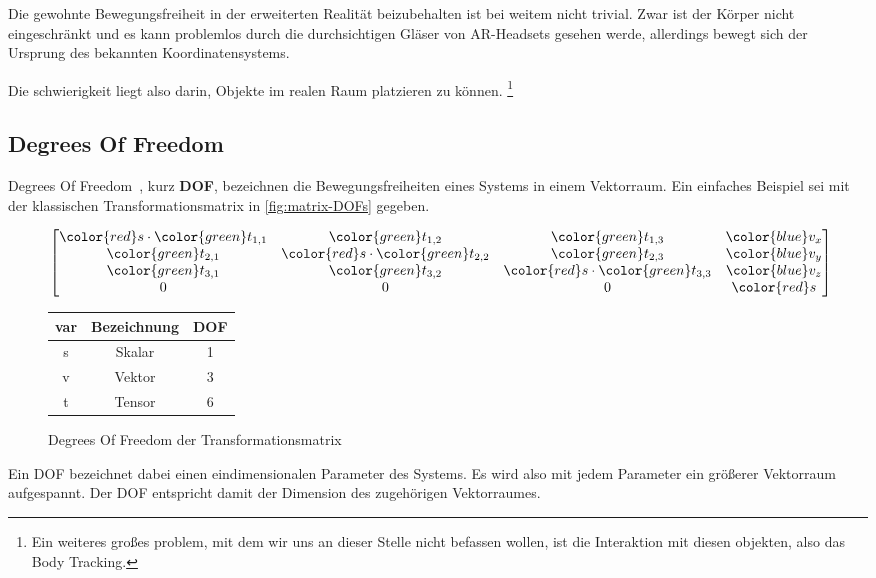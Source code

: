 Die gewohnte Bewegungsfreiheit in der erweiterten Realität beizubehalten ist bei weitem nicht trivial.
Zwar ist der Körper nicht eingeschränkt und es kann problemlos durch die durchsichtigen Gläser von AR-Headsets gesehen werde, allerdings bewegt sich der Ursprung des bekannten Koordinatensystems.

Die schwierigkeit liegt also darin, Objekte im realen Raum platzieren zu können.
\footnote{Ein weiteres großes problem, mit dem wir uns an dieser Stelle nicht befassen wollen, ist die Interaktion mit diesen objekten, also das Body Tracking.}

\subsection{Degrees Of Freedom}\label{subsec:degrees-of-freedom}
    Degrees Of Freedom~\autocite{wikipedia-contributors-2023B}, kurz \textbf{DOF}, bezeichnen die Bewegungsfreiheiten eines Systems in einem Vektorraum.
    Ein einfaches Beispiel sei mit der klassischen Transformationsmatrix in \autoref{fig:matrix-DOFs} gegeben.
    \begin{figure}[ht!]
        \label{fig:matrix-DOFs}
        \begin{center}
            \begin{math}
                \begin{bmatrix}
                {\color{red} s}
                    \cdot {\color{green} t_{1,1}} & {\color{green} t_{1,2}}                       & {\color{green} t_{1,3}}                       & {\color{blue} v_x} \\
                    {\color{green} t_{2,1}}       & {\color{red} s} \cdot {\color{green} t_{2,2}} & {\color{green} t_{2,3}}                       & {\color{blue} v_y} \\
                    {\color{green} t_{3,1}}       & {\color{green} t_{3,2}}                       & {\color{red} s} \cdot {\color{green} t_{3,3}} & {\color{blue} v_z} \\
                    0                             & 0                                             & 0                                             & {\color{red} s}
                \end{bmatrix}
            \end{math}
        \end{center}
        \begin{tabular}{c|c|c}
            var             & Bezeichnung & DOF \\
            \hline
            \color{red} s   & Skalar      & 1   \\
            \color{blue} v  & Vektor      & 3   \\
            \color{green} t & Tensor      & 6   \\
        \end{tabular}
        \caption{Degrees Of Freedom der Transformationsmatrix}
    \end{figure}
    Ein DOF bezeichnet dabei einen eindimensionalen Parameter des Systems.
    Es wird also mit jedem Parameter ein größerer Vektorraum aufgespannt.
    Der DOF entspricht damit der Dimension des zugehörigen Vektorraumes.

